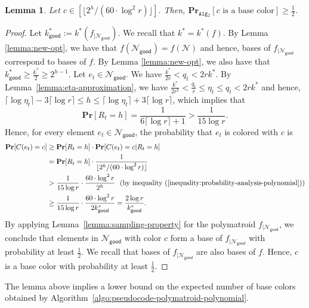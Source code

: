 \documentclass[11pt]{article}
\newtheorem{lemma}{Lemma}
\theoremstyle{definition}
\newcommand{\calN}{{\mathcal{N}}}
\newcommand{\good}{\mathsf{good}}
\begin{document}
\begin{lemma}\label{lemma:proper-color-probability-poly}
    Let $c \in [\lfloor 2^h/ (60\cdot \log^2 r)\rfloor]$. Then, $\mathbf{Pr}_{\texttt{Alg$_2$} }[c \text{ is a base color}]\geq \frac{1}{2}$.
\end{lemma}
\begin{proof}
    Let $k^*_{\good}:=k^*(f_{|\calN_{\good}})$. We recall that $k^*=k^*(f)$.
   By Lemma \ref{lemma:new-opt}, we have that $f(\calN_{\good})=f(\calN)$ and hence, bases of $f_{|\calN_{\good}}$ correspond to bases of $f$. By Lemma \ref{lemma:new-opt}, we also have that $k^*_{\good}\geq \frac{k^*}{2}\geq 2^{h-1}$. Let $e_t\in \mathcal{N}_{\good}$. We have $\frac{k^*}{2r}< q_t < 2rk^*$. By Lemma~\ref{lemma:eta-approximation}, we have $\frac{k^*}{2r^2}<\frac{q_t}{r}\leq \eta_t\leq q_t<2rk^*$ and hence, $\lceil \log \eta_t \rceil -3\lceil \log r\rceil \leq h\leq \lceil \log \eta_t \rceil+3\lceil \log r \rceil$, which implies that
    \begin{equation}\label{inequality:probability-analysis-polynomial}
        \mathbf{Pr}[R_t=h]=\frac{1}{6\lceil \log r \rceil+1}>\frac{1}{15\log r}.
    \end{equation}
    Hence, for every element $e_t\in \mathcal{N}_{\good}$, 
    the probability that $e_t$ is colored with $c$ is
    $$\begin{aligned}
        \mathbf{Pr}[C(e_t)=c] &\geq \mathbf{Pr}[R_t=h]\cdot \mathbf{Pr}[C(e_t)=c|R_t=h] \\
        &= \mathbf{Pr}[R_t=h] \cdot \frac{1}{\lfloor 2^h/ (60\cdot \log^2 r)\rfloor} \\
        &> \frac{1}{15\log r}\cdot \frac{60\cdot \log^2 r}{2^h} \ \ \text{(by inequality~(\ref{inequality:probability-analysis-polynomial}))}\\
        &\geq \frac{1}{15\log r}\cdot \frac{60\cdot \log^2 r}{2k^*_{\good}}= \frac{2\log r}{k^*_{\good}}.
    \end{aligned}$$
    By applying Lemma~\ref{lemma:sampling-property} for the polymatroid $f_{|\mathcal{N}_{\good}}$, we conclude that elements in $\calN_{\good}$ with color $c$ form a base of $f_{|\calN_{\good}}$ with  probability at least $\frac{1}{2}$. We recall that bases of $f_{|\calN_{\good}}$ are also bases of $f$. Hence, $c$ is a base color with probability at least $\frac{1}{2}$. 
\end{proof}

The lemma above implies a lower bound on the expected number of base colors obtained by Algorithm~\ref{algo:pseudocode-polymatroid-polynomial}.
\end{document}
